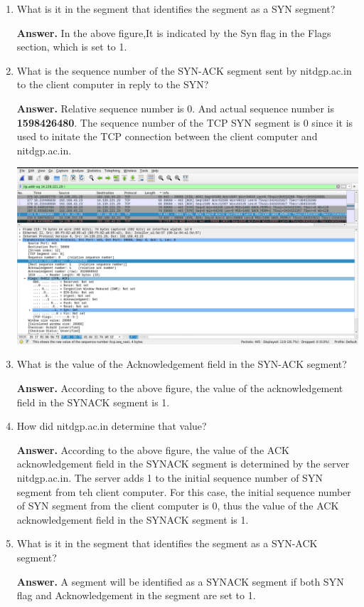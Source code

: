 \documentclass{article}
\begin{document}
\begin{enumerate}
\begin{enumerate}
\item What is it in the segment that identifies the segment as a SYN segment?

\textbf{Answer.} In the above figure,It is indicated by the Syn flag in the Flags section, which is set to 1.

\item What is the sequence number of the SYN-ACK segment sent by nitdgp.ac.in to the client
computer in reply to the SYN?

\textbf{Answer.} Relative sequence number is 0. And actual sequence number is \textbf{1598426480}. The sequence number	of the TCP SYN segment is 0	since it is used to initate	the	TCP	connection between the client computer and	nitdgp.ac.in.

\includegraphics[width=700pt]{Question3F}

\item What is the value of the Acknowledgement field in the SYN-ACK segment?

\textbf{Answer.} According to the above figure, the value of the acknowledgement field in the SYNACK segment is 1.

\item How did nitdgp.ac.in determine that value?

\textbf{Answer.} According to the above figure, the value of the ACK acknowledgement field in the SYNACK segment is determined by the server nitdgp.ac.in. The server adds 1 to the initial sequence number of SYN segment from teh client computer. For this case, the initial sequence number of SYN segment from the client computer is 0, thus the value of the ACK acknowledgement field in the SYNACK segment is 1.

\item What is it in the segment that identifies the segment as a SYN-ACK segment?

\textbf{Answer.} A segment will be identified as a SYNACK segment if both SYN flag and Acknowledgement in the segment are set to 1.

\end{enumerate}
\end{enumerate}
\end{document}
